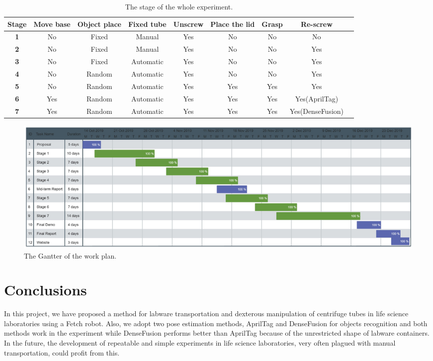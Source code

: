 \documentclass[12pt,draftclsnofoot,onecolumn]{IEEEtran}
\begin{document}
\begin{table}[!hb]
	\centering
	\caption{The stage of the whole experiment. }\label{tab}%
	\begin{threeparttable}
		\begin{tabular}{ccccccccc}
			\toprule
			\textbf{Stage}& \textbf{Move base}& \textbf{Object place}& \textbf{Fixed tube} & \textbf{Unscrew}& \textbf{Place the lid}& \textbf{Grasp}& \textbf{Re-screw}\\
			\midrule
\textbf{1}& No&Fixed&Manual&Yes&No&No&No\\
\textbf{2}& No&Fixed&Manual&Yes&No&No&Yes\\
\textbf{3}& No&Fixed&Automatic&Yes&No&No&Yes\\
\textbf{4}& No&Random&Automatic&Yes&No&No&Yes\\
\textbf{5}& No&Random&Automatic&Yes&Yes&Yes&Yes\\
\textbf{6}& Yes&Random&Automatic&Yes&Yes&Yes&Yes(AprilTag)\\
\textbf{7}& Yes&Random&Automatic&Yes&Yes&Yes&Yes(DenseFusion)\\
			\bottomrule
		\end{tabular}
		
	\end{threeparttable}
\end{table}

\begin{figure}[H]
		\centering
		\includegraphics[width=\textwidth]{img/g1.jpg}
		\caption{
			The Gantter of the work plan.
		}
		\label{gantter}
	\end{figure}
	
	\section{Conclusions}
	In this project, we have proposed a method for labware transportation and dexterous manipulation of centrifuge tubes in life science laboratories using a Fetch robot. Also, we adopt two pose estimation methods, AprilTag and DenseFusion for objects recognition and both methods work in the experiment while DenseFusion performs better than AprilTag because of the unrestricted shape of labware containers. In the future, the development of  repeatable and simple experiments in life science laboratories, very often plagued with manual transportation, could profit from this.
	
\end{document}
